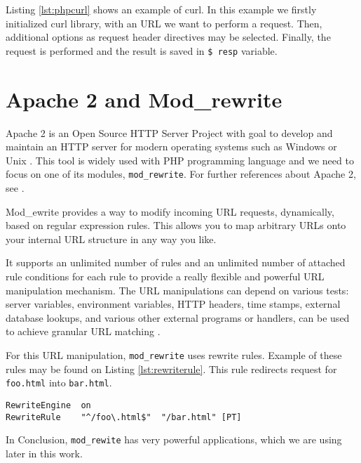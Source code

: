 Listing \ref{lst:phpcurl} shows an example of curl. In this example we firstly initialized curl library, with an URL we want to perform a request. Then, additional options as request header directives may be selected. Finally, the request is performed and the result is saved in \texttt{\$ resp} variable.

\section{Apache 2 and Mod\_rewrite}
Apache 2 is an Open Source HTTP Server Project with goal to develop and maintain an HTTP server for modern operating systems such as Windows or Unix \cite{modrewrite}. This tool is widely used with PHP programming language and we need to focus on one of its modules, \texttt{mod\_rewrite}. For further references about Apache 2, see \cite{modrewrite}.

Mod\_ewrite provides a way to modify incoming URL requests, dynamically, based on regular expression rules. This allows you to map arbitrary URLs onto your internal URL structure in any way you like.

It supports an unlimited number of rules and an unlimited number of attached rule conditions for each rule to provide a really flexible and powerful URL manipulation mechanism. The URL manipulations can depend on various tests: server variables, environment variables, HTTP headers, time stamps, external database lookups, and various other external programs or handlers, can be used to achieve granular URL matching \cite{modrewrite}.

For this URL manipulation, \texttt{mod\_rewrite} uses rewrite rules. Example of these rules may be found on Listing \ref{lst:rewriterule}. This rule redirects request for \texttt{foo.html} into \texttt{bar.html}. 



\begin{lstlisting}[caption={Example rewrite rule},label={lst:rewriterule}]
RewriteEngine  on
RewriteRule    "^/foo\.html$"  "/bar.html" [PT]
\end{lstlisting}

In Conclusion, \texttt{mod\_rewite} has very powerful applications, which we are using later in this work.








